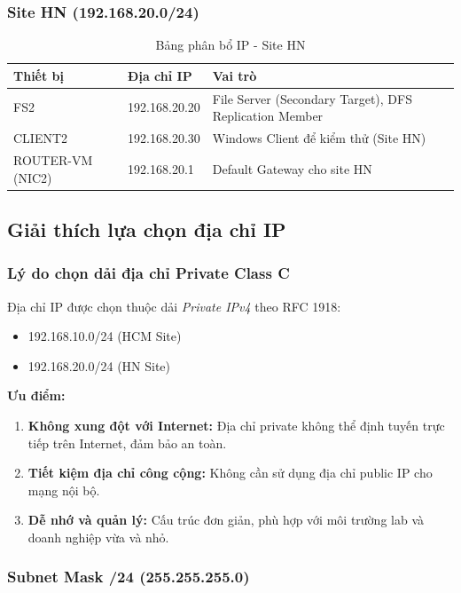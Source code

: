 \subsubsection{Site HN (192.168.20.0/24)}

\begin{table}[H]
\centering
\begin{tabularx}{\textwidth}{|l|l|X|}
\hline
\textbf{Thiết bị} & \textbf{Địa chỉ IP} & \textbf{Vai trò} \\ \hline
FS2 & 192.168.20.20 & File Server (Secondary Target), DFS Replication Member \\ \hline
CLIENT2 & 192.168.20.30 & Windows Client để kiểm thử (Site HN) \\ \hline
ROUTER-VM (NIC2) & 192.168.20.1 & Default Gateway cho site HN \\ \hline
\end{tabularx}
\caption{Bảng phân bổ IP - Site HN}
\label{tab:ip-hn}
\end{table}

\subsection{Giải thích lựa chọn địa chỉ IP}

\subsubsection{Lý do chọn dải địa chỉ Private Class C}

Địa chỉ IP được chọn thuộc dải \textit{Private IPv4} theo RFC 1918:
\begin{itemize}
    \item 192.168.10.0/24 (HCM Site)
    \item 192.168.20.0/24 (HN Site)
\end{itemize}

\textbf{Ưu điểm:}
\begin{enumerate}
    \item \textbf{Không xung đột với Internet:} Địa chỉ private không thể định tuyến trực tiếp trên Internet, đảm bảo an toàn.
    \item \textbf{Tiết kiệm địa chỉ công cộng:} Không cần sử dụng địa chỉ public IP cho mạng nội bộ.
    \item \textbf{Dễ nhớ và quản lý:} Cấu trúc đơn giản, phù hợp với môi trường lab và doanh nghiệp vừa và nhỏ.
\end{enumerate}

\subsubsection{Subnet Mask /24 (255.255.255.0)}

